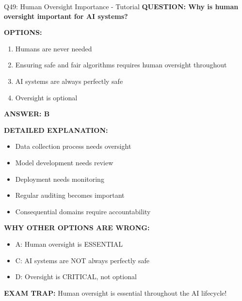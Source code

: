 \documentclass[8pt]{beamer}
\begin{document}
	\begin{frame}{Q49: Human Oversight Importance - Tutorial}
		\fontsize{6.5}{7.5}\selectfont
		\textbf{QUESTION: Why is human oversight important for AI systems?}
		
		\vspace{0.1cm}
		\textbf{OPTIONS:}
		\begin{enumerate}
			\item Humans are never needed
			\item Ensuring safe and fair algorithms requires human oversight throughout
			\item AI systems are always perfectly safe
			\item Oversight is optional
		\end{enumerate}
		
		\vspace{0.1cm}
		\textcolor{myblue}{\textbf{ANSWER: B}}
		
		\vspace{0.1cm}
		\textbf{DETAILED EXPLANATION:}
		\begin{itemize}
			\item Data collection process needs oversight
			\item Model development needs review
			\item Deployment needs monitoring
			\item Regular auditing becomes important
			\item Consequential domains require accountability
		\end{itemize}
		
		\vspace{0.1cm}
		\textcolor{myred}{\textbf{WHY OTHER OPTIONS ARE WRONG:}}
		\begin{itemize}
			\item \textcolor{myred}{A:} Human oversight is ESSENTIAL
			\item \textcolor{myred}{C:} AI systems are NOT always perfectly safe
			\item \textcolor{myred}{D:} Oversight is CRITICAL, not optional
		\end{itemize}
		
		\textcolor{myred}{\textbf{EXAM TRAP:}} Human oversight is \textcolor{myblue}{essential throughout the AI lifecycle}!
	\end{frame}
	
\end{document}
